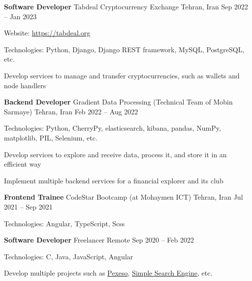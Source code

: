 \documentclass[]{awesome-cv}
\begin{document}
\vspace{-7mm}
\begin{cventries}
	\cventry
	{\textbf{Software Developer}}
	{Tabdeal Cryptocurrency Exchange}
	{Tehran, Iran}
	{Sep 2022 – Jan 2023}
	{\begin{cvitems}
		\vspace{1mm}
		\item[] {\hspace{-9mm} Website: \href{https://tabdeal.org}{\textcolor{awesome}{https://tabdeal.org}}}
		\vspace{1mm}
		\item {Technologies: Python, Django, Django REST framework, MySQL, PostgreSQL, etc.}
		\vspace{1mm}
		\item {Develop services to manage and transfer cryptocurrencies, such as wallets and node handlers}
	\end{cvitems}}
	\cventry
	{\textbf{Backend Developer}}
	{Gradient Data Processing (Technical Team of Mobin Sarmaye)}
	{Tehran, Iran}
	{Feb 2022 – Aug 2022}
	{\begin{cvitems}
		\vspace{1mm}
		\item {Technologies: Python, CherryPy, elasticsearch, kibana, pandas, NumPy, matplotlib, PIL, Selenium, etc.}
		\vspace{1mm}
		\item {Develop services to explore and receive data, process it, and store it in an efficient way}
		\vspace{1mm}
		\item {Implement multiple backend services for a financial explorer and its club}
	\end{cvitems}}
	\cventry
	{\textbf{Frontend Trainee}}
	{CodeStar Bootcamp (at Mohaymen ICT)}
	{Tehran, Iran}
	{Jul 2021 – Sep 2021}
	{\begin{cvitems}
		\vspace{1mm}
		\item {Technologies: Angular, TypeScript, Scss}
	\end{cvitems}}
	\cventry
	{\textbf{Software Developer}}
	{Freelancer}
	{Remote}
	{Sep 2020 – Feb 2022}
	{\begin{cvitems}
		\vspace{1mm}
		\item {Technologies: C, Java, JavaScript, Angular}
		\vspace{1mm}
		\item {Develop multiple projects such as \href{https://github.com/AshkanShakiba/Pexeso}{\textcolor{awesome}{Pexeso}}, \href{https://github.com/AshkanShakiba/Joojle}{\textcolor{awesome}{Simple Search Engine}}, etc.}
	\end{cvitems}}
\end{cventries}
\end{document}
